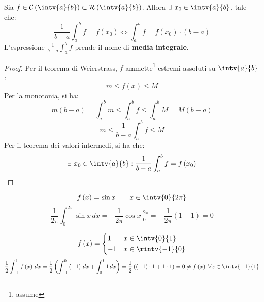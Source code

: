 \begin{theorem}
  Sia $f\in\mathcal{C}\left( \intv{a}{b} \right)\subset\mathcal{R}\left( \intv{a}{b} \right)$. Allora $\exists\ x_0\in\intv{a}{b}$, tale che:
  $$\frac{1}{b-a}\int_a^bf=f\left( x_0 \right)\iff \int_a^bf=f\left( x_0 \right)\cdot\left( b-a \right)$$
  L'espressione $\frac{1}{b-a}\int_a^bf$ prende il nome di \textbf{media integrale}.
\end{theorem}
\begin{proof}
  Per il teorema di Weierstrass, $f$ ammette\footnote{assume} estremi assoluti su $\intv{a}{b}$:
  $$m\le f\left( x \right)\le M$$
  Per la monotonia, si ha:
  $$m\left( b-a \right)=\int_a^bm\le \int_a^bf\le \int_a^bM=M\left( b-a \right)$$
  $$m\le \frac{1}{b-a}\int_a^bf\le M$$
  Per il teorema dei valori intermedi, si ha che:
  $$\exists\ x_0\in\intv{a}{b}:\frac{1}{b-a}\int_a^bf=f\left( x_0 \right)$$
\end{proof}

\begin{example}
  $$f\left( x \right)=\sin x\qquad x\in\intv{0}{2\pi}$$
  $$\frac{1}{2\pi}\int_0^{2\pi}\sin x\,dx=-\frac{1}{2\pi}\cos x\Big|_0^{2\pi}=-\frac{1}{2\pi}\left( 1-1 \right)=0$$
\end{example}

\begin{example}
  $$
    f\left( x \right)=
    \begin{cases}
      1  & x\in\intv{0}{1}   \\
      -1 & x\in\rintv{-1}{0} \\
    \end{cases}
  $$
  $$\frac{1}{2}\int_{-1}^1f\left( x \right)\,dx=\frac{1}{2}\left( \int_{-1}^0\left( -1 \right)\,dx+\int_0^11\,dx \right)=\frac{1}{2}\left( \left( -1 \right)\cdot1+1\cdot1 \right)=0\neq f\left( x \right)\ \forall x\in\intv{-1}{1}$$
\end{example}

